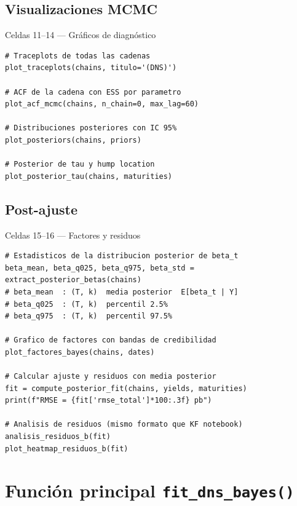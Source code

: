 \documentclass[12pt, a4paper]{article}
\theoremstyle{plain}
\theoremstyle{definition}
\theoremstyle{remark}
\begin{document}
\subsection{Visualizaciones MCMC}

\begin{codigocaja}{Celdas 11--14 — Gráficos de diagnóstico}
\begin{lstlisting}
# Traceplots de todas las cadenas
plot_traceplots(chains, titulo='(DNS)')

# ACF de la cadena con ESS por parametro
plot_acf_mcmc(chains, n_chain=0, max_lag=60)

# Distribuciones posteriores con IC 95%
plot_posteriors(chains, priors)

# Posterior de tau y hump location
plot_posterior_tau(chains, maturities)
\end{lstlisting}
\end{codigocaja}

\subsection{Post-ajuste}

\begin{codigocaja}{Celdas 15--16 — Factores y residuos}
\begin{lstlisting}
# Estadisticos de la distribucion posterior de beta_t
beta_mean, beta_q025, beta_q975, beta_std = extract_posterior_betas(chains)
# beta_mean  : (T, k)  media posterior  E[beta_t | Y]
# beta_q025  : (T, k)  percentil 2.5%
# beta_q975  : (T, k)  percentil 97.5%

# Grafico de factores con bandas de credibilidad
plot_factores_bayes(chains, dates)

# Calcular ajuste y residuos con media posterior
fit = compute_posterior_fit(chains, yields, maturities)
print(f"RMSE = {fit['rmse_total']*100:.3f} pb")

# Analisis de residuos (mismo formato que KF notebook)
analisis_residuos_b(fit)
plot_heatmap_residuos_b(fit)
\end{lstlisting}
\end{codigocaja}

\section{Función principal \texttt{fit\_dns\_bayes()}}
\end{document}
